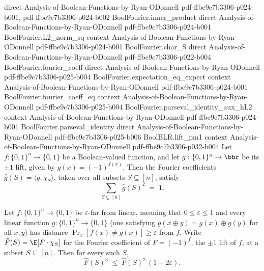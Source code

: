 \begin{lemma}
  {direct}
  {Analysis-of-Boolean-Functions-by-Ryan-ODonnell}
  {pdf-ffbe9c7b3306-p024-b001,
    pdf-ffbe9c7b3306-p024-b002}
\proofstep
  {BoolFourier.inner_product}
  {direct}
  {Analysis-of-Boolean-Functions-by-Ryan-ODonnell}
  {pdf-ffbe9c7b3306-p024-b001}
\proofstep
  {BoolFourier.L2_norm_sq}
  {context}
  {Analysis-of-Boolean-Functions-by-Ryan-ODonnell}
  {pdf-ffbe9c7b3306-p024-b001}
\proofstep
  {BoolFourier.char_S}
  {direct}
  {Analysis-of-Boolean-Functions-by-Ryan-ODonnell}
  {pdf-ffbe9c7b3306-p022-b004}
\proofstep
  {BoolFourier.fourier_coeff}
  {direct}
  {Analysis-of-Boolean-Functions-by-Ryan-ODonnell}
  {pdf-ffbe9c7b3306-p025-b004}
\proofstep
  {BoolFourier.expectation_eq_expect}
  {context}
  {Analysis-of-Boolean-Functions-by-Ryan-ODonnell}
  {pdf-ffbe9c7b3306-p024-b001}
\proofstep
  {BoolFourier.fourier_coeff_eq}
  {context}
  {Analysis-of-Boolean-Functions-by-Ryan-ODonnell}
  {pdf-ffbe9c7b3306-p025-b004}
\proofstep
  {BoolFourier.parseval_identity_aux_hL2}
  {context}
  {Analysis-of-Boolean-Functions-by-Ryan-ODonnell}
  {pdf-ffbe9c7b3306-p024-b001}
\proofstep
  {BoolFourier.parseval_identity}
  {direct}
  {Analysis-of-Boolean-Functions-by-Ryan-ODonnell}
  {pdf-ffbe9c7b3306-p025-b006}
\proofstep
  {BoolBLR.lift_pm1}
  {context}
  {Analysis-of-Boolean-Functions-by-Ryan-ODonnell}
  {pdf-ffbe9c7b3306-p032-b004}
Let $f : \{0,1\}^n \to \{0,1\}$ be a Boolean-valued function, and let $g : \{0,1\}^n \to
\bbr$ be its $\pm 1$ lift, given by $g(x) = (-1)^{f(x)}$. Then the Fourier coefficients
$\hat g(S) = \langle g, \chi_S\rangle$, taken over all subsets $S \subseteq [n]$,
satisfy
\[
  \sum_{S \subseteq [n]} \hat g(S)^2 \;=\; 1.
\]
\end{lemma}

\begin{lemma}
\label{BoolBLR.BLR_soundness_via_fourier_aux_h_bound}
\leanok
{}
Let $f : \{0,1\}^n \to \{0,1\}$ be $\varepsilon$-far from linear, meaning that $0 \le
\varepsilon \le 1$ and every linear function $g : \{0,1\}^n \to \{0,1\}$ (one satisfying
$g(x \oplus y) = g(x) \oplus g(y)$ for all $x,y$) has distance $\Pr_{x}[f(x) \ne g(x)]
\ge \varepsilon$ from $f$. Write $\hat F(S) = \E[F \cdot \chi_S]$ for the Fourier
coefficient of $F = (-1)^{f}$, the $\pm 1$ lift of $f$, at a subset $S \subseteq [n]$.
Then for every such $S$,
\[
  \hat F(S)^3 \;\le\; \hat F(S)^2\,(1 - 2\varepsilon).
\]
\end{lemma}

